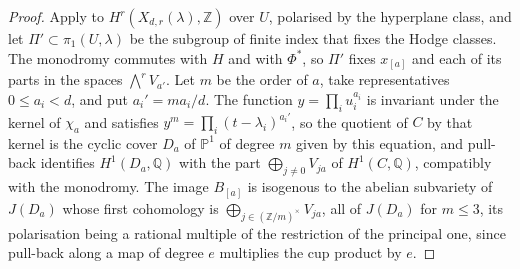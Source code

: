 \documentclass[11pt,reqno]{amsart}
\theoremstyle{plain}
\theoremstyle{definition}
\theoremstyle{remark}
\newcommand{\QQ}{\mathbb{Q}}
\newcommand{\ZZ}{\mathbb{Z}}
\newcommand{\PP}{\mathbb{P}}
\begin{document}
\begin{proof}
Apply  to $H^{r}(X_{d,r}(\lambda),\ZZ)$ over $U$,
polarised by the hyperplane class, and let $\Pi'\subset\pi_{1}(U,\lambda)$ be
the subgroup of finite index that fixes the Hodge classes. The monodromy
commutes with $H$ and with $\Phi^{*}$, so $\Pi'$ fixes $x_{[a]}$ and each of
its parts in the spaces $\bigwedge^{r}V_{a'}$. Let $m$ be the order of $a$,
take representatives $0\le a_{i}<d$, and put $a_{i}'=ma_{i}/d$. The function
$y=\prod_{i}u_{i}^{a_{i}}$ is invariant under the kernel of $\chi_{a}$ and
satisfies $y^{m}=\prod_{i}(t-\lambda_{i})^{a_{i}'}$, so the quotient of $C$ by
that kernel is the cyclic cover $D_{a}$ of $\PP^{1}$ of degree $m$ given by
this equation, and pull-back identifies $H^{1}(D_{a},\QQ)$ with the part
$\bigoplus_{j\ne0}V_{ja}$ of $H^{1}(C,\QQ)$, compatibly with the monodromy.
The image $B_{[a]}$ is isogenous to the abelian subvariety of $J(D_{a})$
whose first cohomology is $\bigoplus_{j\in(\ZZ/m)^{\times}}V_{ja}$, all of
$J(D_{a})$ for $m\le3$, its polarisation being a rational multiple of the
restriction of the principal one, since pull-back along a map of degree $e$
multiplies the cup product by $e$.


\end{proof}
\end{document}
